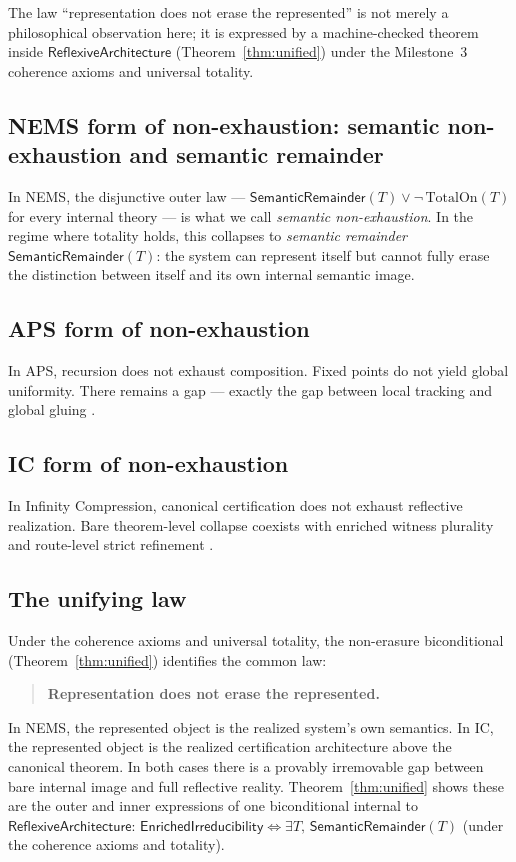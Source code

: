 \documentclass[11pt]{article}
\newcommand{\SemRem}{\ensuremath{\mathsf{SemanticRemainder}}}
\newcommand{\RAL}{\ensuremath{\mathsf{ReflexiveArchitecture}}}
\newcommand{\EnrIrr}{\ensuremath{\mathsf{EnrichedIrreducibility}}}
\begin{document}
The law ``representation does not erase the represented'' is not merely a philosophical
observation here; it is expressed by a machine-checked theorem inside $\RAL$
(Theorem~\ref{thm:unified}) under the Milestone~3 coherence axioms and universal totality.

\subsection{NEMS form of non-exhaustion: semantic non-exhaustion and semantic remainder}

In NEMS, the disjunctive outer law --- $\SemRem(T) \lor \neg\,\mathrm{TotalOn}(T)$ for
every internal theory --- is what we call \emph{semantic non-exhaustion}.  In the
regime where totality holds, this collapses to \emph{semantic remainder} $\SemRem(T)$:
the system can represent itself but cannot fully erase the distinction between itself
and its own internal semantic image.

\subsection{APS form of non-exhaustion}

In APS, recursion does not exhaust composition.  Fixed points do not yield global
uniformity.  There remains a gap --- exactly the gap between local tracking and global
gluing \cite{SpivackAPS2026}.

\subsection{IC form of non-exhaustion}

In Infinity Compression, canonical certification does not exhaust reflective realization.
Bare theorem-level collapse coexists with enriched witness plurality and route-level
strict refinement \cite{SpivackIC2026}.

\subsection{The unifying law}

Under the coherence axioms and universal totality, the non-erasure biconditional
(Theorem~\ref{thm:unified}) identifies the common law:

\begin{quote}
\textbf{Representation does not erase the represented.}
\end{quote}

In NEMS, the represented object is the realized system's own semantics.  In IC, the
represented object is the realized certification architecture above the canonical theorem.
In both cases there is a provably irremovable gap between bare internal image and full
reflective reality.  Theorem~\ref{thm:unified} shows these are the outer and inner
expressions of one biconditional internal to $\RAL$:
\(
\EnrIrr \iff \exists T,\, \SemRem(T)
\)
(under the coherence axioms and totality).
\end{document}
